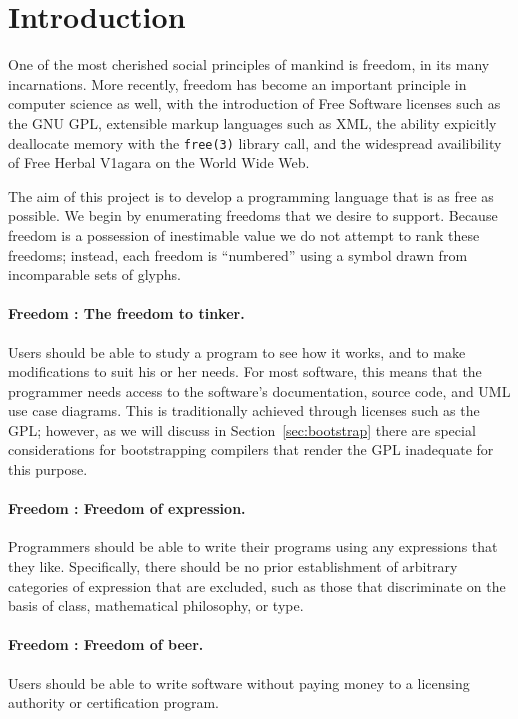 \documentclass[twocolumn]{article}
\begin{document}
\section{Introduction}

One of the most cherished social principles of mankind is
freedom,\z{} in its many incarnations. More recently,
freedom has become an important principle in computer science as well,
with the introduction of Free Software licenses such as the GNU
GPL,\z{} extensible markup languages
such as XML,\z{} the ability expicitly deallocate memory
with the {\tt free(3)} library call, and the widespread availibility of
Free Herbal V1agara on the World Wide Web.\z{}

The aim of this project is to develop a programming language that is
as free as possible. We begin by enumerating freedoms that we desire
to support. Because freedom is a possession of inestimable
value we do not attempt to rank these freedoms; instead,
each freedom is ``numbered'' using a symbol drawn from incomparable
sets of glyphs.

\paragraph{Freedom \ftinker: The freedom to tinker.}
Users should be able to study a program to see how it works, and to
make modifications to suit his or her needs. For most software, this
means that the programmer needs access to the software's
documentation, source code, and UML
use case diagrams. This is traditionally achieved through licenses
such as the GPL; however, as we will discuss in
Section~\ref{sec:bootstrap} there are special considerations for
bootstrapping compilers that render the GPL inadequate for this
purpose.

\paragraph{Freedom \fexpression: Freedom of expression.}
Programmers should be able to write their programs using any
expressions that they like. Specifically, there should be no
prior establishment of arbitrary categories of expression that
are excluded, such as those that discriminate on the basis
of class, mathematical philosophy, or type.


\paragraph{Freedom \fbeer: Freedom of beer.}
Users should be able to write software without paying money to a
licensing authority or certification program.
\end{document}
